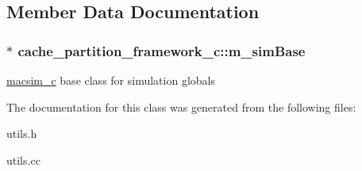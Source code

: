 \subsection{Member Data Documentation}
\hypertarget{classcache__partition__framework__c_acf0d0acfce51d2c198b919b0ac1c5edf}{
\subsubsection[{m\_\-simBase}]{$\ast$ {\bf cache\_\-partition\_\-framework\_\-c::m\_\-simBase}}}
\label{classcache__partition__framework__c_acf0d0acfce51d2c198b919b0ac1c5edf}
\hyperlink{classmacsim__c}{macsim\_\-c} base class for simulation globals 

The documentation for this class was generated from the following files:\begin{DoxyCompactItemize}
\item 
utils.h\item 
utils.cc\end{DoxyCompactItemize}
